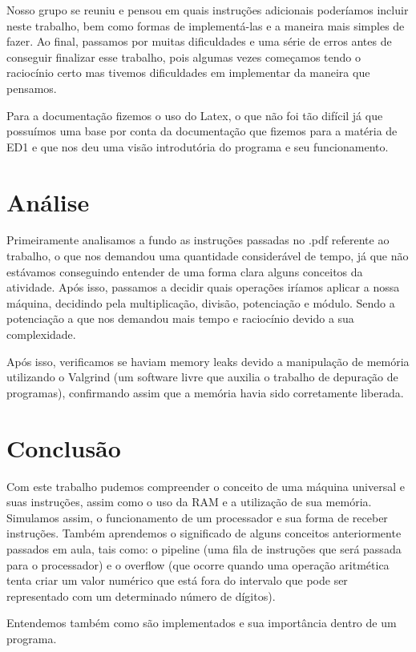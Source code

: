 \documentclass{article}
\begin{document}
Nosso grupo se reuniu e pensou em quais instruções adicionais poderíamos incluir neste trabalho, bem como formas de implementá-las e a maneira mais simples de fazer. Ao final, passamos por muitas dificuldades e uma série de erros antes de conseguir finalizar esse trabalho, pois algumas vezes começamos tendo o raciocínio certo mas tivemos dificuldades em implementar da maneira que pensamos.

Para a documentação fizemos o uso do Latex, o que não foi tão difícil já que possuímos uma base por conta da documentação que fizemos para a matéria de ED1 e que nos deu uma visão introdutória do programa e seu funcionamento.

\section{Análise}

Primeiramente analisamos a fundo as instruções passadas no .pdf referente ao trabalho, o que nos demandou uma quantidade considerável de tempo, já que não estávamos conseguindo entender de uma forma clara alguns conceitos da atividade. Após isso, passamos a decidir quais operações iríamos aplicar a nossa máquina, decidindo pela multiplicação, divisão, potenciação e módulo. Sendo a potenciação a que nos demandou mais tempo e raciocínio devido a sua complexidade.

Após isso, verificamos se haviam memory leaks devido a manipulação de memória utilizando o Valgrind (um software livre que auxilia o trabalho de depuração de programas), confirmando assim que a memória havia sido corretamente liberada.

\section{Conclusão}

Com este trabalho pudemos compreender o conceito de uma máquina universal e suas instruções, assim como o uso da RAM e a utilização de sua memória. Simulamos assim, o funcionamento de um processador e sua forma de receber instruções. Também aprendemos o significado de alguns conceitos anteriormente passados em aula, tais como:  
o pipeline (uma fila de instruções que será passada para o processador) e o overflow (que ocorre quando uma operação aritmética tenta criar um valor numérico que está fora do intervalo que pode ser representado com um determinado número de dígitos).

Entendemos também como são implementados e sua importância dentro de um programa.
\end{document}
